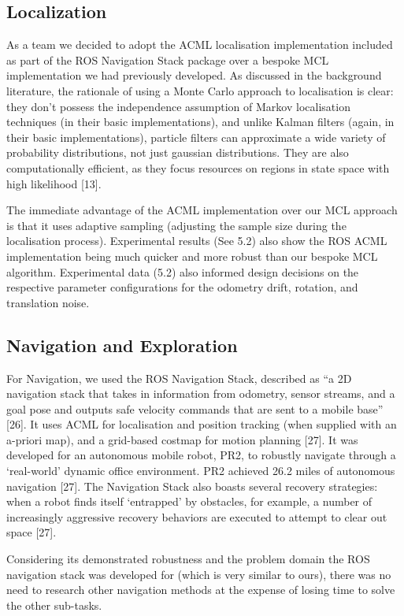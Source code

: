 \documentclass{article}
\begin{document}
	\subsection{Localization}
	As a team we decided to adopt the ACML localisation implementation included as part of the ROS Navigation Stack package over a bespoke MCL implementation we had previously developed. As discussed in the background literature, the rationale of using a Monte Carlo approach to localisation is clear: they don’t possess the independence assumption of Markov localisation techniques (in their basic implementations), and unlike Kalman filters (again, in their basic implementations), particle filters can approximate a wide variety of probability distributions, not just gaussian distributions. They are also computationally efficient, as they focus resources on regions in state space with high likelihood [13]. 

The immediate advantage of the ACML implementation over our MCL approach is that it uses adaptive sampling (adjusting the sample size during the localisation process). Experimental results (See 5.2) also show the ROS ACML implementation being much quicker and more robust than our bespoke MCL algorithm. Experimental data (5.2) also informed design decisions on the respective parameter configurations for the odometry drift, rotation, and translation noise.

	\subsection{Navigation and Exploration}
	For Navigation, we used the ROS Navigation Stack,  described as “a 2D navigation stack that takes in information from odometry, sensor streams, and a goal pose and outputs safe velocity commands that are sent to a mobile base” [26].  It uses ACML for localisation and position tracking (when supplied with an a-priori map), and a grid-based costmap for motion planning [27]. It was developed for an autonomous mobile robot, PR2, to robustly navigate through a ‘real-world’ dynamic office environment. PR2 achieved 26.2 miles of autonomous navigation [27].  The Navigation Stack also boasts several recovery strategies: when a robot finds itself ‘entrapped’ by obstacles, for example, a number of increasingly aggressive recovery behaviors are executed to attempt to clear out space [27]. 

Considering its demonstrated robustness and the problem domain the ROS navigation stack was developed for (which is very similar to ours), there was no need to research other navigation methods at the expense of losing time to solve the other sub-tasks.
\end{document}

